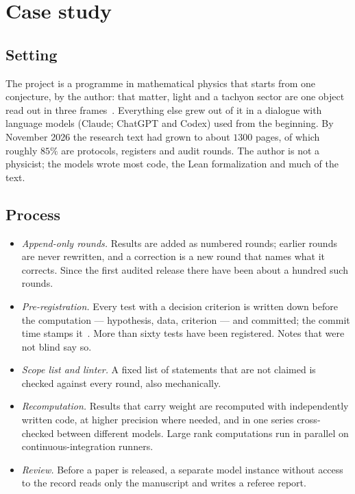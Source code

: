 \section{Case study}\label{sec:case}

\subsection{Setting}

The project is a programme in mathematical physics that starts from one conjecture, by the author: that matter, light and a tachyon
sector are one object read out in three frames~\cite{companion,physics}.  Everything else grew out of it in a dialogue with language models
(Claude; ChatGPT and Codex) used from the beginning.  By November 2026 the research text had grown to about \(1300\) pages, of which roughly
\(85\%\) are protocols, registers and audit rounds.  The author is not a physicist; the models wrote most code, the Lean formalization and much
of the text.

\subsection{Process}

\begin{itemize}
\item \emph{Append-only rounds.}  Results are added as numbered rounds; earlier rounds are never rewritten, and a correction is a new round
that names what it corrects.  Since the first audited release there have been about a hundred such rounds.
\item \emph{Pre-registration.}  Every test with a decision criterion is written down before the computation --- hypothesis, data, criterion ---
and committed; the commit time stamps it~\cite{nosek}.  More than sixty tests have been registered.  Notes that were not blind say so.
\item \emph{Scope list and linter.}  A fixed list of statements that are not claimed is checked against every round, also mechanically.
\item \emph{Recomputation.}  Results that carry weight are recomputed with independently written code, at higher precision where needed,
and in one series cross-checked between different models.  Large rank computations run in parallel on continuous-integration runners.
\item \emph{Review.}  Before a paper is released, a separate model instance without access to the record reads only the manuscript and writes
a referee report.
\end{itemize}

